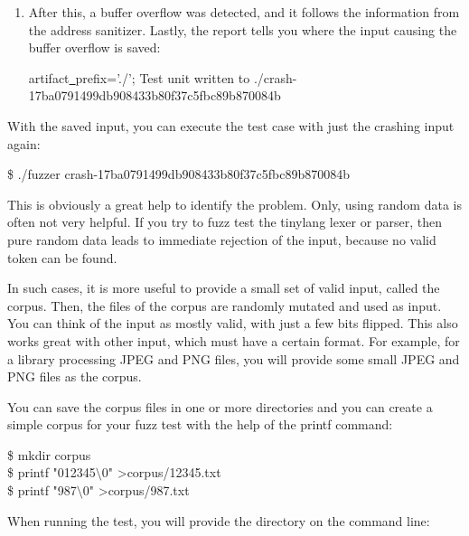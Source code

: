 \begin{enumerate}
\item After this, a buffer overflow was detected, and it follows the information from the address sanitizer. Lastly, the report tells you where the input causing the buffer overflow is saved:
\begin{tcolorbox}[colback=white,colframe=black]
artifact\underline{~}prefix='./'; Test unit written to ./crash-17ba0791499db908433b80f37c5fbc89b87\allowbreak 0084b
\end{tcolorbox}

\end{enumerate}

With the saved input, you can execute the test case with just the crashing input again:\par

\begin{tcolorbox}[colback=white,colframe=black]
\$ ./fuzzer crash-17ba0791499db908433b80f37c5fbc89b870084b
\end{tcolorbox}

This is obviously a great help to identify the problem. Only, using random data is often not very helpful. If you try to fuzz test the tinylang lexer or parser, then pure random data leads to immediate rejection of the input, because no valid token can be found. \par

In such cases, it is more useful to provide a small set of valid input, called the corpus. Then, the files of the corpus are randomly mutated and used as input. You can think of the input as mostly valid, with just a few bits flipped. This also works great with other input, which must have a certain format. For example, for a library processing JPEG and PNG files, you will provide some small JPEG and PNG files as the corpus.\par

You can save the corpus files in one or more directories and you can create a simple corpus for your fuzz test with the help of the printf command:\par

\begin{tcolorbox}[colback=white,colframe=black]
\$ mkdir corpus \\
\$ printf "012345$\setminus$0" >corpus/12345.txt \\
\$ printf "987$\setminus$0" >corpus/987.txt
\end{tcolorbox}

When running the test, you will provide the directory on the command line:\par

